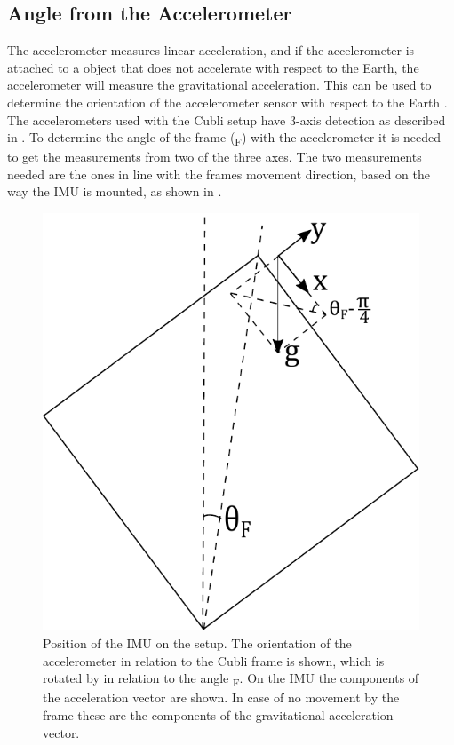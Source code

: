 \subsection{Angle from the Accelerometer}
The accelerometer measures linear acceleration, and if the accelerometer is attached to a object that does not accelerate with respect to the Earth, the accelerometer will measure the gravitational acceleration. This can be used to determine the orientation of the accelerometer sensor with respect to the Earth \cite{JWarren}.\\
The accelerometers used with the Cubli setup have 3-axis detection as described in . To determine the angle of the frame (\si{\theta_F}) with the accelerometer it is needed to get the measurements from two of the three axes. The two measurements needed are the ones in line with the frames movement direction, based on the way the IMU is mounted, as shown in . 
\begin{figure}[H]
	\centering
	\includegraphics[scale=0.58]{figures/accelerometer}
	\caption{Position of the IMU on the setup. The orientation of the accelerometer in relation to the Cubli frame is shown, which is rotated by \si{} in relation to the angle \si{\theta_F}. On the IMU the components of the acceleration vector are shown. In case of no movement by the frame these are the components of the gravitational acceleration vector.}
	\label{accelerometer}
\end{figure}\vspace{-5mm}
